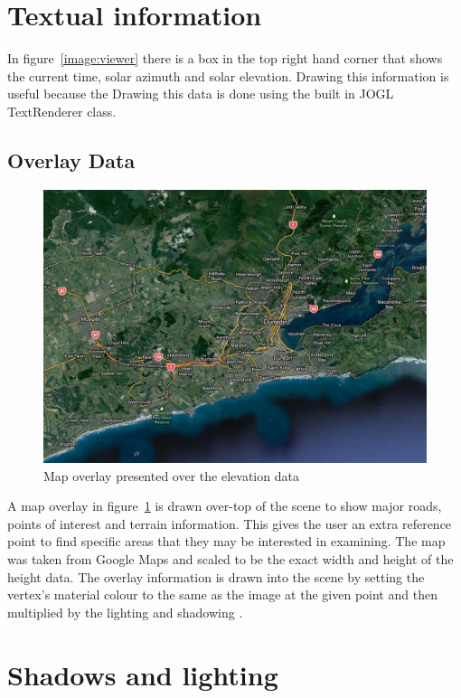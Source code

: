 \documentclass[12pt]{report}
\begin{document}
\section{Textual information}
In figure~\ref{image:viewer} there is a box in the top right hand corner that shows the current time, solar azimuth and solar elevation. Drawing this information is useful because the 
Drawing this data is done using the built in JOGL TextRenderer class.\\

\subsection{Overlay Data}
\begin{figure}[h]
\centering
\includegraphics[scale=0.3]{suburbs.jpg}
\caption{Map overlay presented over the elevation data}
\label{image:overlay}
\end{figure}
A map overlay in figure~\ref{image:overlay} is drawn over-top of the scene to show major roads, points of interest and terrain information. This gives the user an extra reference point to find specific areas that they may be interested in examining. The map was taken from Google Maps\cite{gmaps} and scaled to be the exact width and height of the height data. The overlay information is drawn into the scene by setting the vertex's material colour to the same as the image at the given point and then multiplied by the lighting and shadowing .\\

\section{Shadows and lighting}
\end{document}
